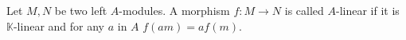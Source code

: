 \documentclass[../thesis.tex]{subfiles}
\begin{document}
\begin{definition}[Modules]
                            



        

        
        

                \end{definition}

                \begin{definition}
                    Let $M,N$ be two left $A$-modules. A morphism $f:M\rightarrow N$ is called $A$-linear if it is $\mathbb{K}$-linear and for any $a$ in $A$ $f(am) = af(m)$.
                \end{definition}
\end{document}
